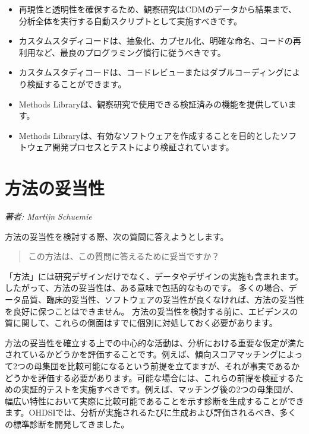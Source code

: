 \documentclass[
  11pt]{book}
\makeatletter
\providecommand{\tightlist}{%
  \setlength{\itemsep}{0pt}\setlength{\parskip}{0pt}}
\newenvironment{kframe}{%
\medskip{}
\setlength{\fboxsep}{.8em}
 \def\at@end@of@kframe{}%
 \ifinner\ifhmode%
  \def\at@end@of@kframe{\end{minipage}}%
  \begin{minipage}{\columnwidth}%
 \fi\fi%
 \def\FrameCommand##1{\hskip\@totalleftmargin \hskip-\fboxsep
 \colorbox{myShadeColor}{##1}\hskip-\fboxsep
     \hskip-\linewidth \hskip-\@totalleftmargin \hskip\columnwidth}%
 \MakeFramed {\advance\hsize-\width
   \@totalleftmargin\z@ \linewidth\hsize
   \@setminipage}}%
 {\par\unskip\endMakeFramed%
 \at@end@of@kframe}
\newenvironment{rmdblock}[1]
  {
  \begin{itemize}
  \renewcommand{\labelitemi}{
    \raisebox{-.7\height}[0pt][0pt]{
      {\setkeys{Gin}{width=3em,keepaspectratio}\texttt{[image: images/\#1]}}
    }
  }
  \setlength{\fboxsep}{1em}
  \begin{kframe}
  \item
  }
  {
  \end{kframe}
  \end{itemize}
  }
\newenvironment{rmdsummary}
  {\begin{rmdblock}{summary}}
  {\end{rmdblock}}
\theoremstyle{definition}
\theoremstyle{definition}
\theoremstyle{definition}
\theoremstyle{definition}
\theoremstyle{remark}
\makeatother
\begin{document}
\begin{rmdsummary}
\begin{itemize}
\tightlist
\item
  再現性と透明性を確保するため、観察研究はCDMのデータから結果まで、分析全体を実行する自動スクリプトとして実施すべきです。
\item
  カスタムスタディコードは、抽象化、カプセル化、明確な命名、コードの再利用など、最良のプログラミング慣行に従うべきです。
\item
  カスタムスタディコードは、コードレビューまたはダブルコーディングにより検証することができます。
\item
  Methods Libraryは、観察研究で使用できる検証済みの機能を提供しています。
\item
  Methods Libraryは、有効なソフトウェアを作成することを目的としたソフトウェア開発プロセスとテストにより検証されています。
\end{itemize}
\end{rmdsummary}

\chapter{方法の妥当性}\label{MethodValidity}


\emph{著者: Martijn Schuemie}

方法の妥当性を検討する際、次の質問に答えようとします。

\begin{quote}
この方法は、この質問に答えるために妥当ですか？
\end{quote}

「方法」には研究デザインだけでなく、データやデザインの実施も含まれます。したがって、方法の妥当性は、ある意味で包括的なものです。 多くの場合、データ品質、臨床的妥当性、ソフトウェアの妥当性が良くなければ、方法の妥当性を良好に保つことはできません。 方法の妥当性を検討する前に、エビデンスの質に関して、これらの側面はすでに個別に対処しておく必要があります。

方法の妥当性を確立する上での中心的な活動は、分析における重要な仮定が満たされているかどうかを評価することです。例えば、傾向スコアマッチングによって2つの母集団を比較可能になるという前提を立てますが、それが事実であるかどうかを評価する必要があります。可能な場合には、これらの前提を検証するための実証的テストを実施すべきです。例えば、マッチング後の2つの母集団が、幅広い特性において実際に比較可能であることを示す診断を生成することができます。OHDSIでは、分析が実施されるたびに生成および評価されるべき、多くの標準診断を開発してきました。
\end{document}
